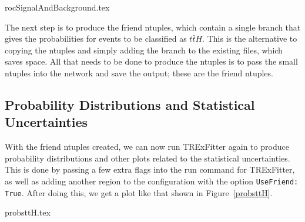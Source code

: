     {rocSignalAndBackground.tex}

    The next step is to produce the friend ntuples, which contain a single branch that gives the probabilities for events to be classified as $t\bar{t}H$. This is the alternative to copying the ntuples and simply adding the branch to the existing files, which saves space. All that needs to be done to produce the ntuples is to pass the small ntuples into the network and save the output; these are the friend ntuples.



\subsection{Probability Distributions and Statistical Uncertainties}
    With the friend ntuples created, we can now run TRExFitter again to produce probability distributions and other plots related to the statistical uncertainties. This is done by passing a few extra flags into the run command for TRExFitter, as well as adding another region to the configuration with the option \texttt{UseFriend: True}. After doing this, we get a plot like that shown in Figure~\ref{probsttH}. 

    {probsttH.tex}
